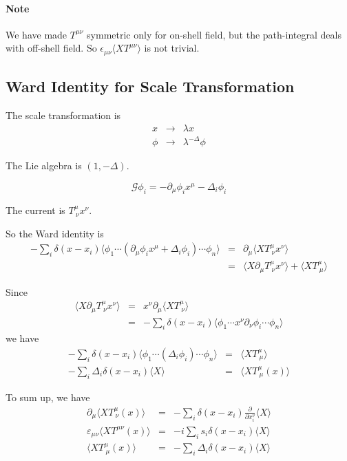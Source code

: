 \documentclass[12pt]{book}
\begin{document}
	\paragraph{Note} We have made $T^{\mu\nu}$ symmetric only for on-shell field, but the path-integral deals with off-shell field. So $\epsilon_{\mu\nu}\langle XT^{\mu\nu}\rangle$ is not trivial.
	
	\subsection{Ward Identity for Scale Transformation}
	The scale transformation is
	\begin{eqnarray}
		x&\rightarrow &\lambda x\\
		\phi&\rightarrow& \lambda^{-\Delta}\phi		
	\end{eqnarray}
	
	The Lie algebra is $(1,-\Delta)$.
	
	\begin{equation}
		\mathcal G\phi_i=-\partial_\mu\phi_i x^\mu-\Delta_i\phi_i
	\end{equation}
	
	The current is $T^\mu_{\ \nu}x^\nu$.
	
	So the Ward identity is 
	\begin{eqnarray}
		-\sum_i\delta(x-x_i)\langle\phi_1\cdots(\partial_\mu\phi_i x^\mu+\Delta_i\phi_i)\cdots\phi_n\rangle
		&=&\partial_\mu\langle XT^\mu_{\ \nu}x^\nu\rangle\\
		&=&\langle X\partial_\mu T^\mu_{\ \nu}x^\nu\rangle+\langle XT^\mu_{\ \mu}\rangle
	\end{eqnarray}
	
	Since
	\begin{eqnarray}
		\langle X\partial_\mu T^\mu_{\ \nu}x^\nu\rangle&=&x^\nu\partial_\mu\langle X T^\mu_{\ \nu}\rangle\\
		&=& -\sum_i\delta(x-x_i)\langle\phi_1\cdots x^\nu\partial_\nu\phi_i\cdots\phi_n\rangle
	\end{eqnarray}
	we have
	\begin{eqnarray}
		-\sum_i\delta(x-x_i)\langle\phi_1\cdots(\Delta_i\phi_i)\cdots\phi_n\rangle &=&\langle XT^\mu_{\ \mu}\rangle\\
		-\sum_i\Delta_i\delta(x-x_i)\langle X\rangle &=&\langle XT^\mu_{\ \mu}(x)\rangle
	\end{eqnarray}
	
	To sum up, we have
	\begin{eqnarray}
		\partial_\mu\langle XT^\mu_{\ \nu}(x)\rangle &=& -\sum_i\delta(x-x_i)\frac{\partial}{\partial x_i^{\nu}} \langle X\rangle\\
		\varepsilon_{\mu\nu}\langle XT^{\mu\nu}(x)\rangle &=& -i\sum_is_i\delta(x-x_i)\langle X\rangle\\
		\langle XT^\mu_{\ \mu}(x)\rangle &=& -\sum_i\Delta_i\delta(x-x_i)\langle X\rangle
	\end{eqnarray}
	
\end{document}
